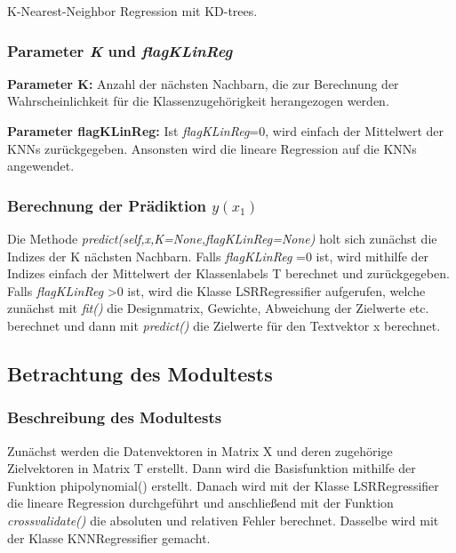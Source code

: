 \noindent
 \vspace{0px}
K-Nearest-Neighbor Regression mit KD-trees. 

\subsubsection{ Parameter \textit{K} und \textit{flagKLinReg} }

\noindent
\textbf{Parameter K:} Anzahl der nächsten Nachbarn, die zur Berechnung der Wahrscheinlichkeit für die Klassenzugehörigkeit herangezogen werden.  

\noindent
\textbf{Parameter flagKLinReg:} Ist \textit{flagKLinReg}=0, wird einfach der Mittelwert der KNNs zurückgegeben.
Ansonsten wird die lineare Regression auf die KNNs angewendet. 

\subsubsection{ Berechnung der Prädiktion \textit{$y(x_1)$} }

Die Methode \textit{predict(self,x,K=None,flagKLinReg=None)} holt sich zunächst die Indizes der K nächsten Nachbarn. 
Falls \textit{ flagKLinReg }=0 ist, wird mithilfe der Indizes einfach der Mittelwert der Klassenlabels T berechnet und zurückgegeben. 
Falls \textit{ flagKLinReg }>0 ist, wird die Klasse LSRRegressifier aufgerufen, welche zunächst mit \textit{ fit() } die Designmatrix, Gewichte, Abweichung der Zielwerte etc. berechnet und dann mit \textit{ predict() } die Zielwerte für den Textvektor x berechnet. 

\subsection{Betrachtung des Modultests}
 
\subsubsection{Beschreibung des Modultests}

Zunächst werden die Datenvektoren in Matrix X und deren zugehörige Zielvektoren in Matrix T erstellt. Dann wird die Basisfunktion mithilfe der Funktion {phi\textunderscore polynomial()} erstellt.
Danach wird mit der Klasse LSRRegressifier die lineare Regression durchgeführt und anschließend mit der Funktion \textit{crossvalidate()} die absoluten und relativen Fehler berechnet. 
Dasselbe wird mit der Klasse KNNRegressifier gemacht. 

